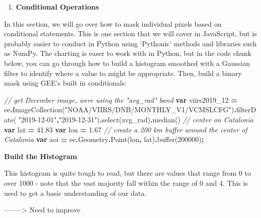 \documentclass[
]{article}
\newenvironment{Shaded}{\begin{snugshade}}{\end{snugshade}}
\newcommand{\AttributeTok}[1]{\textcolor[rgb]{0.77,0.63,0.00}{#1}}
\newcommand{\CommentTok}[1]{\textcolor[rgb]{0.56,0.35,0.01}{\textit{#1}}}
\newcommand{\DecValTok}[1]{\textcolor[rgb]{0.00,0.00,0.81}{#1}}
\newcommand{\FloatTok}[1]{\textcolor[rgb]{0.00,0.00,0.81}{#1}}
\newcommand{\FunctionTok}[1]{\textcolor[rgb]{0.00,0.00,0.00}{#1}}
\newcommand{\KeywordTok}[1]{\textcolor[rgb]{0.13,0.29,0.53}{\textbf{#1}}}
\newcommand{\NormalTok}[1]{#1}
\newcommand{\OperatorTok}[1]{\textcolor[rgb]{0.81,0.36,0.00}{\textbf{#1}}}
\newcommand{\StringTok}[1]{\textcolor[rgb]{0.31,0.60,0.02}{#1}}
\providecommand{\tightlist}{%
  \setlength{\itemsep}{0pt}\setlength{\parskip}{0pt}}
\begin{document}
\begin{enumerate}
\def\labelenumi{\arabic{enumi}.}
\setcounter{enumi}{2}
\tightlist
\item
  \textbf{Conditional Operations}
\end{enumerate}

In this section, we will go over how to mask individual pixels based on conditional statements. This is one section that we will cover in JavaScript, but is probably easier to conduct in Python using `Pythonic' methods and libraries such as NumPy. The charting is easer to work with in Python, but in the code chunk below, you can go through how to build a histogram smoothed with a Gaussian filter to identify where a value to might be appropriate. Then, build a binary mask using GEE's built in conditionals:

\begin{Shaded}
\begin{Highlighting}[]
\CommentTok{// get December image, we\textquotesingle{}re using the "avg\_rad" band}
\KeywordTok{var}\NormalTok{ viirs2019\_12 }\OperatorTok{=}\NormalTok{ ee}\OperatorTok{.}\FunctionTok{ImageCollection}\NormalTok{(}\StringTok{"NOAA/VIIRS/DNB/MONTHLY\_V1/VCMSLCFG"}\NormalTok{)}\OperatorTok{.}\FunctionTok{filterDate}\NormalTok{(}
  \StringTok{"2019{-}12{-}01"}\OperatorTok{,}\StringTok{"2019{-}12{-}31"}\NormalTok{)}\OperatorTok{.}\FunctionTok{select}\NormalTok{(}\StringTok{\textquotesingle{}avg\_rad\textquotesingle{}}\NormalTok{)}\OperatorTok{.}\FunctionTok{median}\NormalTok{()}
\CommentTok{// center on Catalonia}
\KeywordTok{var}\NormalTok{ lat }\OperatorTok{=} \FloatTok{41.83}
\KeywordTok{var}\NormalTok{ lon }\OperatorTok{=} \FloatTok{1.67}
\CommentTok{// create a 200 km buffer around the center of Catalonia}
\KeywordTok{var}\NormalTok{ aoi }\OperatorTok{=}\NormalTok{ ee}\OperatorTok{.}\AttributeTok{Geometry}\OperatorTok{.}\FunctionTok{Point}\NormalTok{(lon}\OperatorTok{,}\NormalTok{ lat)}\OperatorTok{.}\FunctionTok{buffer}\NormalTok{(}\DecValTok{200000}\NormalTok{)}\OperatorTok{;}
\end{Highlighting}
\end{Shaded}

\textbf{Build the Histogram}

This histogram is quite tough to read, but there are values that range from 0 to over 1000 - note that the vast majority fall within the range of 0 and 4. This is used to get a basic understanding of our data.

--------\textgreater{} Need to improve
\end{document}
